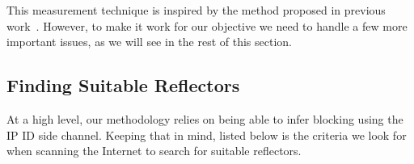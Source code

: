 This measurement technique is inspired by the method proposed in previous
work~\cite{ensafi2014detecting, pearce2017augur}.  However, to make it work for
our objective we need to handle a few more important issues, as we will
see in the rest of this section.



\subsection{Finding Suitable Reflectors}
\label{sec:methrefl}

At a high level, our methodology relies on being able to infer blocking
using the IP ID side channel. Keeping that in mind, listed below is the
criteria we look for when scanning the Internet to search for suitable
reflectors.

